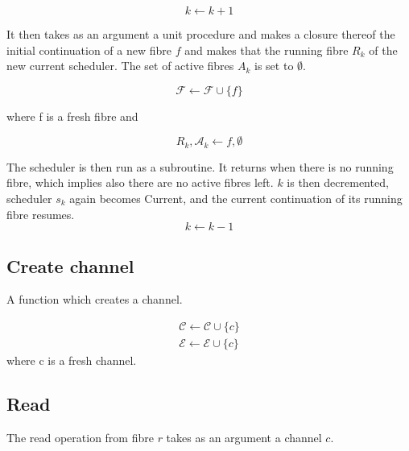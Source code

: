 \documentclass{article}
\begin{document}
\begin{equation}
k \leftarrow k + 1
\end{equation}


It then takes as an argument a unit procedure and makes
a closure thereof the initial continuation
of a new fibre $f$ and makes that the running fibre $R_k$ of
the new current scheduler. The set of active fibres $A_k$
is set to $\emptyset$. 

 
\begin{equation}
{\mathcal F} \leftarrow {\mathcal F} \cup \{f\}
\end{equation}

where f is a fresh fibre and

\begin{equation}
R_k,\mathcal A_k \leftarrow
f,\emptyset
\end{equation}

The scheduler is then run as a subroutine. It returns when there
is no running fibre, which implies also there are no active
fibres left. $k$ is then decremented, scheduler $s_k$ again becomes Current, 
and the
current continuation of its running fibre resumes.
\begin{equation}
k \leftarrow k - 1
\end{equation}

\subsection{Create channel}
A function which creates a channel.

\begin{align}
{\mathcal C} \leftarrow {\mathcal C} \cup \{c\}\\
{\mathcal E} \leftarrow {\mathcal E} \cup \{c\}
\end{align}
where c is a fresh channel.

\subsection{Read}
The read operation from fibre $r$ takes as an argument a channel $c$.
\end{document}
